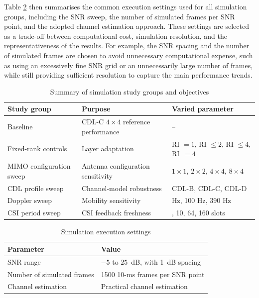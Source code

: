 \documentclass[a4paper,12pt,onecolumn]{article}
\begin{document}
		Table \ref{tab:simulation_execution} then summarises the common execution settings used for all simulation groups, including the SNR sweep, the number of simulated frames per SNR point, and the adopted channel estimation approach. These settings are selected as a trade-off between computational cost, simulation resolution, and the representativeness of the results. For example, the SNR spacing and the number of simulated frames are chosen to avoid unnecessary computational expense, such as using an excessively fine SNR grid or an unnecessarily large number of frames, while still providing sufficient resolution to capture the main performance trends.
	
	
	\begin{table}[H]
		\centering
		\caption{Summary of simulation study groups and objectives}
		\label{tab:sim_studies}
		\small
		\setlength{\tabcolsep}{5pt}
		\renewcommand{\arraystretch}{1.12}
		\begin{tabularx}{0.95\textwidth}{
				>{\raggedright\arraybackslash}p{}
				>{\raggedright\arraybackslash}X
				>{\raggedright\arraybackslash}p{}
			}
			\toprule
			\textbf{Study group} & \textbf{Purpose} & \textbf{Varied parameter} \\
			\midrule
			Baseline 
			& CDL-C \(4 \times 4\) reference performance 
			& -- \\
			
			Fixed-rank controls 
			& Layer adaptation 
			& RI \(=1\), RI \(\leq 2\), RI \(\leq 4\), \mbox{RI \(=4\)} \\
			
			MIMO configuration sweep 
			& Antenna configuration sensitivity 
			& \(1 \times 1\), \(2 \times 2\), \(4 \times 4\), \(8 \times 4\) \\
			
			CDL profile sweep 
			& Channel-model robustness 
			& CDL-B, CDL-C, CDL-D \\
			
			Doppler sweep 
			& Mobility sensitivity 
			& 10 Hz, 100 Hz, 390 Hz \\
			
			CSI period sweep 
			& CSI feedback freshness 
			& 4, 10, 64, 160 slots \\
			\bottomrule
		\end{tabularx}
	\end{table}
	
	\begin{table}[H]
		\centering
		\caption{Simulation execution settings}
		\label{tab:simulation_execution}
		\begin{tabular}{ll}
			\toprule
			\textbf{Parameter} & \textbf{Value} \\
			\midrule
			SNR range & $-5$ to $25$~dB, with 1~dB spacing \\
			Number of simulated frames & 1500 10-ms frames per SNR point \\
			Channel estimation & Practical channel estimation \\
			\bottomrule
		\end{tabular}
	\end{table}
\end{document}
